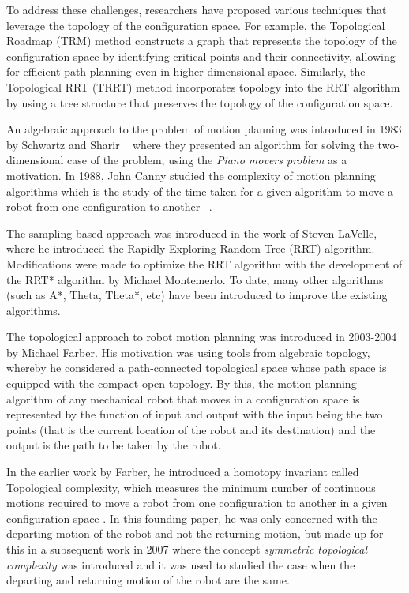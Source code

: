 To address these challenges, researchers have proposed various techniques that leverage the topology of the configuration space. For example, the Topological Roadmap (TRM) method constructs a graph that represents the topology of the configuration space by identifying critical points and their connectivity, allowing for efficient path planning even in higher-dimensional space. Similarly, the Topological RRT (TRRT) method incorporates topology into the RRT algorithm by using a tree structure that preserves the topology of the configuration space.

An algebraic approach to the problem of motion planning was introduced in 1983 by Schwartz and Sharir ~\cite{schwartz:1983a} where they presented an algorithm for solving the two-dimensional case of the problem, using the \textit{Piano movers problem} as a motivation. In 1988, John Canny studied the complexity of motion planning algorithms which is the study of the time taken for a given algorithm to move a robot from one configuration to another ~\cite{canny1988}.

The sampling-based approach was introduced in the work of Steven LaVelle, where he introduced the Rapidly-Exploring Random Tree (RRT) algorithm. Modifications were made to optimize the RRT algorithm with the development of the RRT* algorithm by Michael Montemerlo. To date, many other algorithms (such as A*, Theta, Theta*, etc) have been introduced to improve the existing algorithms.

The topological approach to robot motion planning was introduced in 2003-2004 by Michael Farber. His motivation was using tools from algebraic topology, whereby he considered a path-connected topological space whose path space is equipped with the compact open topology. By this, the motion planning algorithm of any mechanical robot that moves in a configuration space is represented by the function of input and output with the input being the two points (that is the current location of the robot and its destination) and the output is the path to be taken by the robot.

In the earlier work by Farber, he introduced a homotopy invariant called Topological complexity, which measures the minimum number of continuous motions required to move a robot from one configuration to another in a given configuration space \cite{farber2003topological}. In this founding paper, he was only concerned with the departing motion of the robot and not the returning motion, but made up for this in a subsequent work in 2007 \cite{farber2007symmetric} where the concept \textit{symmetric topological complexity} was introduced and it was used to studied the case when the departing and returning motion of the robot are the same.

